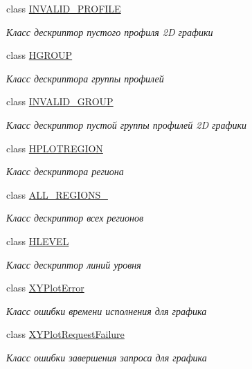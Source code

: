 \begin{DoxyCompactItemize}
class \hyperlink{classxyplot_1_1_i_n_v_a_l_i_d___p_r_o_f_i_l_e}{I\-N\-V\-A\-L\-I\-D\-\_\-\-P\-R\-O\-F\-I\-L\-E}
\begin{DoxyCompactList}\small\item\em Класс дескриптор пустого профиля 2\-D графики \end{DoxyCompactList}\item 
class \hyperlink{classxyplot_1_1_h_g_r_o_u_p}{H\-G\-R\-O\-U\-P}
\begin{DoxyCompactList}\small\item\em Класс дескриптора группы профилей \end{DoxyCompactList}\item 
class \hyperlink{classxyplot_1_1_i_n_v_a_l_i_d___g_r_o_u_p}{I\-N\-V\-A\-L\-I\-D\-\_\-\-G\-R\-O\-U\-P}
\begin{DoxyCompactList}\small\item\em Класс дескриптор пустой группы профилей 2\-D графики \end{DoxyCompactList}\item 
class \hyperlink{classxyplot_1_1_h_p_l_o_t_r_e_g_i_o_n}{H\-P\-L\-O\-T\-R\-E\-G\-I\-O\-N}
\begin{DoxyCompactList}\small\item\em Класс дескриптора региона \end{DoxyCompactList}\item 
class \hyperlink{classxyplot_1_1_a_l_l___r_e_g_i_o_n_s__}{A\-L\-L\-\_\-\-R\-E\-G\-I\-O\-N\-S\-\_\-}
\begin{DoxyCompactList}\small\item\em Класс дескриптор всех регионов \end{DoxyCompactList}\item 
class \hyperlink{classxyplot_1_1_h_l_e_v_e_l}{H\-L\-E\-V\-E\-L}
\begin{DoxyCompactList}\small\item\em Класс дескриптор линий уровня \end{DoxyCompactList}\item 
class \hyperlink{classxyplot_1_1_x_y_plot_error}{X\-Y\-Plot\-Error}
\begin{DoxyCompactList}\small\item\em Класс ошибки времени исполнения для графика \end{DoxyCompactList}\item 
class \hyperlink{classxyplot_1_1_x_y_plot_request_failure}{X\-Y\-Plot\-Request\-Failure}
\begin{DoxyCompactList}\small\item\em Класс ошибки завершения запроса для графика \end{DoxyCompactList}\end{DoxyCompactItemize}
